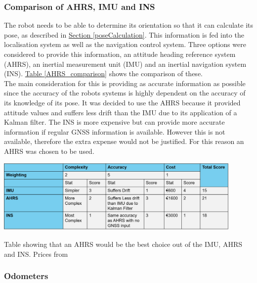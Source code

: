 \documentclass[11pt]{article}		%
\newcommand{\tableref}[1]{\hyperref[#1]{Table \ref*{#1}}}     %
\newcommand{\sectref}[1]{\hyperref[#1]{Section \ref*{#1}}}     %
\begin{document}
            \subsubsection{Comparison of AHRS, IMU and INS}
            
            The robot needs to be able to determine its orientation so that it can calculate its pose, as described in \sectref{poseCalculation}.
            This information is fed into the localisation system as well as the navigation control system. 
            Three options were considered to provide this information, an attitude heading reference system (AHRS), an inertial measurement unit (IMU) and an inertial navigation system (INS). \tableref{AHRS_comparison} shows the comparison of these.
            \\
            The main consideration for this is providing as accurate information as possible since the accuracy of the robots systems is highly dependent on the accuracy of its knowledge of its pose. 
            It was decided to use the AHRS because it provided attitude values and suffers less drift than the IMU due to its application of a Kalman filter. 
            The INS is more expensive but can provide more accurate information if regular GNSS information is available. 
            However this is not available, therefore the extra expense would not be justified. For this reason an AHRS was chosen to be used.
            \\
            
            
            \begin{table}[h]
					\centering
					\includegraphics[width=0.9\textwidth]{IMU_formatted_table}
					\caption{Table showing that an AHRS would be the best choice out of the IMU, AHRS and INS. Prices from \cite{Ellipse_Ahrs}}
					\label{AHRS_comparison}
				\end{table}
				
        \subsubsection{Odometers}
        
\end{document}
